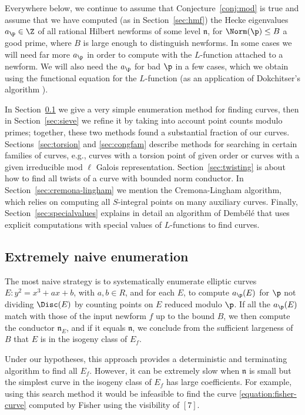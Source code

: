 \documentclass{amsart}
\newcommand{\n}{\mathfrak{n}}
\newcommand{\dembele}{Demb\'el{\'e}\xspace}
\begin{document}
Everywhere below, we continue to assume that Conjecture~\ref{conj:mod}
is true and assume that we have computed (as in Section~\ref{sec:hmf})
the Hecke eigenvalues $a_\p\in \Z$ of all rational Hilbert newforms of
some level $\n$, for $\Norm(\p)\leq B$ a good prime, where $B$ is
large enough to distinguish newforms. In some cases we will need far
more $a_{\p}$ in order to compute with the $L$-function attached to a
newform.  We will also need the $a_{\p}$ for bad $\p$ in a few cases,
which we obtain using the functional equation for the $L$-function (as
an application of Dokchitser's algorithm \cite{dokchitser:lfun}).



In Section~\ref{sec:naive} we give a very simple enumeration method
for finding curves, then in Section~\ref{sec:sieve} we refine it by
taking into account point counts modulo primes; together, these two
methods found a substantial fraction of our curves.
Sections~\ref{sec:torsion} and \ref{sec:congfam} describe methods for
searching in certain families of curves, e.g., curves with a torsion
point of given order or curves with a given irreducible mod $\ell$
Galois representation.  Section~\ref{sec:twisting} is about how to
find all twists of a curve with bounded norm conductor.  In
Section~\ref{sec:cremona-lingham} we mention the Cremona-Lingham
algorithm, which relies on computing all $S$-integral points on many
auxiliary curves.  Finally, Section~\ref{sec:specialvalues} explains
in detail an algorithm of \dembele{} that uses  explicit
computations with special values of $L$-functions to find curves.


\subsection{Extremely naive enumeration}\label{sec:naive}

The most naive strategy is to systematically enumerate 
 elliptic curves $E: y^2 = x^3 + ax + b$, with $a,b\in R$,
and for each $E$, to compute $a_\p(E)$ for $\p$ not dividing $\Disc(E)$
 by counting points on $E$ reduced modulo $\p$.  If all the $a_\p(E)$ match
 with those of the input newform $f$ up to the bound $B$, we then compute
 the conductor $\n_E$, and if it equals $\n$, we conclude from the sufficient 
largeness of $B$ that $E$ is in the isogeny class of $E_f$.

Under our hypotheses, this approach provides a deterministic and 
terminating algorithm to find all $E_f$. However, it can be extremely slow
 when $\n$ is small but the simplest curve in the isogeny class 
of $E_f$ has large coefficients.  For example, using this search method it would be infeasible to find the curve \eqref{equation:fisher-curve}
computed by Fisher using the visibility of \Sha$[7]$.
\end{document}
